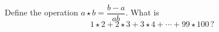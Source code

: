 Define the operation $a\star b=\dfrac{b-a}{ab}$. What is
\[1\star2+2\star3+3\star4+\cdots+99\star100\,?\]
